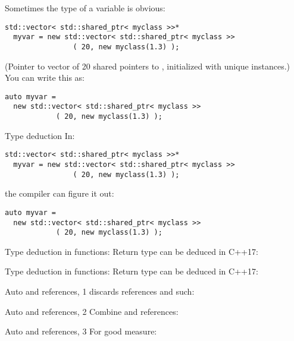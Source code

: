 Sometimes the type of a variable is obvious:
\begin{verbatim}
std::vector< std::shared_ptr< myclass >>*
  myvar = new std::vector< std::shared_ptr< myclass >>
                ( 20, new myclass(1.3) );
\end{verbatim}
(Pointer to vector of 20 shared pointers to , initialized
with unique instances.)  You can write this as:
\begin{verbatim}
auto myvar =
  new std::vector< std::shared_ptr< myclass >>
            ( 20, new myclass(1.3) );
\end{verbatim}

\begin{slide}{Type deduction}
  \label{sl:auto-deduct}
In:
\begin{verbatim}
std::vector< std::shared_ptr< myclass >>*
  myvar = new std::vector< std::shared_ptr< myclass >>
                ( 20, new myclass(1.3) );
\end{verbatim}
the compiler can figure it out:
\begin{verbatim}
auto myvar =
  new std::vector< std::shared_ptr< myclass >>
            ( 20, new myclass(1.3) );
\end{verbatim}
\end{slide}

\begin{block}{Type deduction in functions}:
  \label{sl:auto-fun}
  Return type can be deduced in C++17:
\end{block}

\begin{block}{Type deduction in functions}:
  \label{sl:auto-method}
  Return type can be deduced in C++17:
\end{block}

\begin{block}{Auto and references, 1}
  \label{sl:auto-ref1}
   discards references and such:
\end{block}

\begin{block}{Auto and references, 2}
  \label{sl:auto-ref2}
  Combine  and references:
\end{block}

\begin{block}{Auto and references, 3}
  \label{sl:auto-ref3}
  For good measure:
\end{block}

